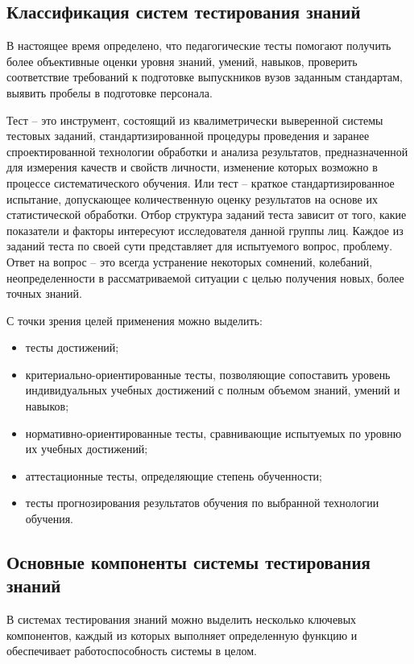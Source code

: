 \subsection{Классификация систем тестирования знаний}

В настоящее время определено, что педагогические тесты помогают
получить более объективные оценки уровня знаний, умений, навыков,
проверить соответствие требований к подготовке выпускников вузов заданным
стандартам, выявить пробелы в подготовке персонала.

Тест – это инструмент, состоящий из квалиметрически выверенной системы тестовых заданий, стандартизированной процедуры проведения и заранее спроектированной технологии обработки и анализа результатов, предназначенной для измерения качеств и свойств личности, изменение которых возможно в процессе систематического обучения. Или тест – краткое стандартизированное испытание, допускающее количественную оценку результатов на основе их
статистической обработки. Отбор структура заданий теста зависит от того, какие показатели и факторы интересуют исследователя данной группы лиц. Каждое из заданий теста по своей сути представляет для испытуемого вопрос, проблему. Ответ на вопрос – это всегда устранение некоторых сомнений, колебаний, неопределенности в рассматриваемой ситуации с целью получения новых, более точных знаний.

С точки зрения целей применения можно выделить:

\begin{itemize}
	\item тесты достижений;
	\item критериально-ориентированные тесты, позволяющие сопоставить
	уровень индивидуальных учебных достижений с полным объемом знаний,
	умений и навыков;
	\item нормативно-ориентированные тесты, сравнивающие испытуемых по
	уровню их учебных достижений;
	\item аттестационные тесты, определяющие степень обученности;
	\item тесты прогнозирования результатов обучения по выбранной
	технологии обучения.
\end{itemize}

\subsection{Основные компоненты системы тестирования знаний}

В системах тестирования знаний можно выделить несколько ключевых компонентов, каждый из которых выполняет определенную функцию и обеспечивает работоспособность системы в целом.

